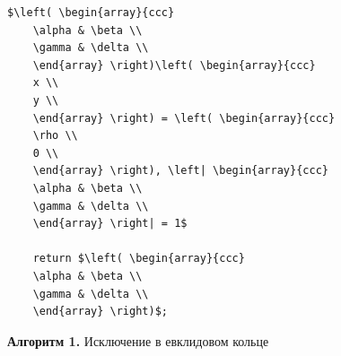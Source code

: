 \begin{lstlisting}[mathescape=true]
    $\left( \begin{array}{ccc}
    \alpha & \beta \\
    \gamma & \delta \\
    \end{array} \right)\left( \begin{array}{ccc}
    x \\
    y \\
    \end{array} \right) = \left( \begin{array}{ccc}
    \rho \\
    0 \\
    \end{array} \right), \left| \begin{array}{ccc}
    \alpha & \beta \\
    \gamma & \delta \\
    \end{array} \right| = 1$

    return $\left( \begin{array}{ccc}
    \alpha & \beta \\
    \gamma & \delta \\
    \end{array} \right)$;

\end{lstlisting}
\begin{center}
{\bf Алгоритм 1.} Исключение в евклидовом кольце
\end{center}
